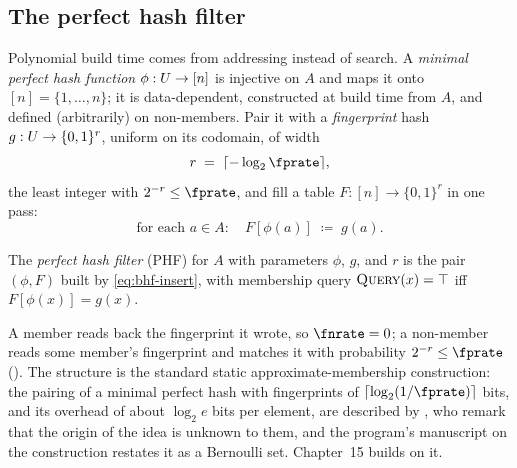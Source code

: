 \subsection*{The perfect hash filter}

Polynomial build time comes from addressing instead of search. A
\emph{minimal perfect hash function}
$\phi : U \to [n]$ is injective on $A$ and maps it onto $[n] =
\{1, \ldots, n\}$; it is data-dependent, constructed at build time from
$A$, and defined (arbitrarily) on non-members. Pair it with a
\emph{fingerprint} hash $g : U \to \{0,
1\}^{r}$, uniform on its codomain, of width
\begin{equation}
\label{eq:bhf-r}
  r \;=\; \lceil -\log_2 \fprate \rceil,
\end{equation}
the least integer with $2^{-r} \le \fprate$, and fill a table $F : [n]
\to \{0, 1\}^r$ in one pass:
\begin{equation}
\label{eq:bhf-insert}
  \text{for each } a \in A: \quad F[\phi(a)] \;\coloneqq\; g(a).
\end{equation}

\begin{definition}
\label{def:phf}
The \emph{perfect hash filter} (PHF) for $A$ with parameters $\phi$, $g$,
and $r$ is the pair $(\phi, F)$ built by \eqref{eq:bhf-insert}, with
membership query $\textsc{Query}(x) = \top$ iff $F[\phi(x)] = g(x)$.
\end{definition}

\begin{algorithm}[ht]
  \caption{Perfect hash filter construction and query}
  \label{alg:phf-build-query}

  \BlankLine
\end{algorithm}

A member reads back the fingerprint it wrote, so $\fnrate = 0$; a
non-member reads some member's fingerprint and matches it with
probability $2^{-r} \le \fprate$ (). The structure is
the standard static approximate-membership construction: the pairing of
a minimal perfect hash with fingerprints of
$\lceil \log_2(1/\fprate) \rceil$ bits, and its overhead of about $\log_2 e$ bits per element, are
described by \textcite[Sec.~1]{dietzfelbinger-pagh-2008}, who remark
that the origin of the idea is unknown to them, and the program's
manuscript on the construction \parencite{towell-bernoulli-phf} restates
it as a Bernoulli set. Chapter~15 builds on it.

